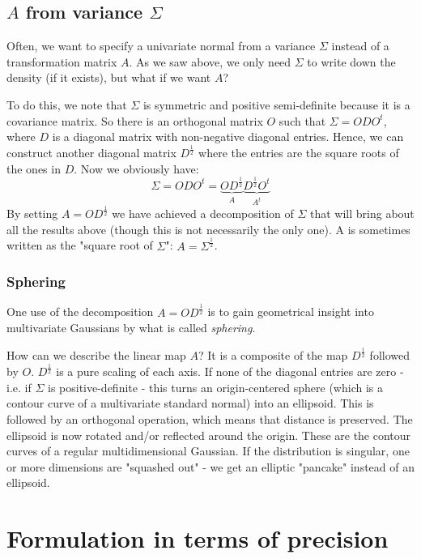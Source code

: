 \documentclass[12pt, a4paper]{article}
\numberwithin{equation}{section}
\begin{document}
\subsection{$A$ from variance $\Sigma$}
Often, we want to specify a univariate normal from a variance $\Sigma$ instead of a transformation matrix $A$. As we saw above, we only need $\Sigma$ to write down the density (if it exists), but what if we want $A$?

To do this, we note that $\Sigma$ is symmetric and positive semi-definite because it is a covariance matrix. So there is an orthogonal matrix $O$ such that $\Sigma=ODO^t$, where $D$ is a diagonal matrix with non-negative diagonal entries. Hence, we can construct another diagonal matrix $D^{\frac{1}{2}}$ where the entries are the square roots of the ones in $D$. Now we obviously have:
\begin{equation}
\Sigma=ODO^t=\underbrace{OD^{\frac{1}{2}}}_{A}\underbrace{D^{\frac{1}{2}}O^t}_{A^t}
\end{equation}
By setting $A=OD^{\frac{1}{2}}$ we have achieved a decomposition of $\Sigma$ that will bring about all the results above (though this is not necessarily the only one). A is sometimes written as the "square root of $\Sigma$": $A=\Sigma^{\frac{1}{2}}$.

\subsubsection{Sphering}
One use of the decomposition $A=OD^{\frac{1}{2}}$ is to gain geometrical insight into multivariate Gaussians by what is called \textit{sphering}.

How can we describe the linear map $A$? It is a composite of the map $D^{\frac{1}{2}}$ followed by $O$. $D^{\frac{1}{2}}$ is a pure scaling of each axis. If none of the diagonal entries are zero - i.e. if $\Sigma$ is positive-definite - this turns an origin-centered sphere (which is a contour curve of a multivariate standard normal) into an ellipsoid. This is followed by an orthogonal operation, which means that distance is preserved. The ellipsoid is now rotated and/or reflected around the origin. These are the contour curves of a regular multidimensional Gaussian. If the distribution is singular, one or more dimensions are "squashed out" - we get an elliptic "pancake" instead of an ellipsoid.

\section{Formulation in terms of precision}
\end{document}
